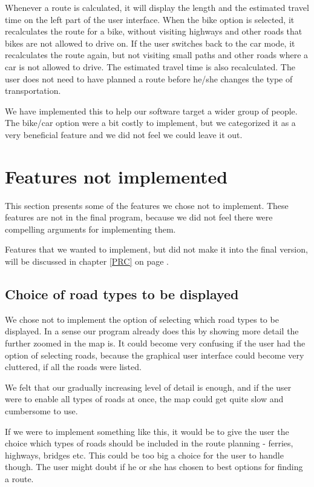Whenever a route is calculated, it will display the length and the estimated
travel time on the left part of the user interface. When the bike option is selected, 
it recalculates the route for a bike, without visiting highways and other roads 
that bikes are not allowed to drive on. If the user switches back to the 
car mode, it recalculates the route again, but not visiting small paths and other 
roads where a car is not allowed to drive. The estimated travel time is also 
recalculated. The user does not need to have planned a route before he/she 
changes the type of transportation.

We have implemented this to help our software target a wider group of people.
The bike/car option were a bit costly to implement, but we categorized it as a
very beneficial feature and we did not feel we could leave it out.

\section{Features not implemented}
\label{UIA-NI}
This section presents some of the features we chose not to implement.
These features are not in the final program, because we did not feel there were
compelling arguments for implementing them.

Features that we wanted to implement, but did not make it into the final version,
will be discussed in chapter \ref{PRC}  on page
\pageref{PRC}.

\subsection{Choice of road types to be displayed}
\label{UIA-NI-CRD}
We chose not to implement the option of selecting which road types to be
displayed. In a sense our program already does this by showing more detail the
further zoomed in the map is. It could become very confusing if the user had the
option of selecting roads, because the graphical user interface could become
very cluttered, if all the roads were listed.

We felt that our gradually increasing level of detail is enough, and if the user were 
to enable all types of roads at once, the map could get quite slow and cumbersome 
to use.

If we were to implement something like this, it would be to give the user the choice 
which types of roads should be included in the route planning - ferries, highways, 
bridges etc. This could be too big a choice for the user to handle though. The
user might doubt if he or she has chosen to best options for finding a route.

